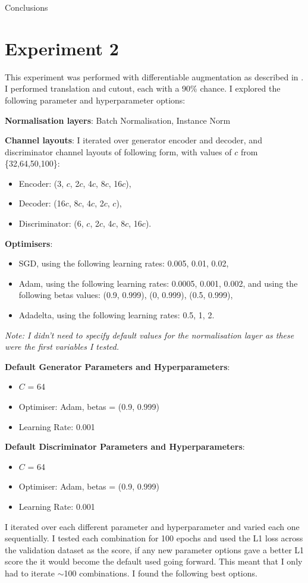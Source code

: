 \documentclass{UoYCSproject}
\begin{document}
Conclusions

\section{Experiment 2}
This experiment was performed with differentiable augmentation as described in \cite{zhao2020differentiable}. I performed translation and cutout, each with a 90\% chance. I explored the following parameter and hyperparameter options:

\textbf{Normalisation layers}: Batch Normalisation, Instance Norm

\textbf{Channel layouts}:
I iterated over generator encoder and decoder, and discriminator channel layouts of following form, with values of $c$ from \{32,64,50,100\}:
\begin{itemize}
\item Encoder: (3, $c$, 2$c$, 4$c$, 8$c$, 16$c$), 
\item Decoder: (16$c$, 8$c$, 4$c$, 2$c$, $c$),
\item Discriminator: (6, $c$, 2$c$, 4$c$, 8$c$, 16$c$).
\end{itemize}

\textbf{Optimisers}:
\begin{itemize}
\item SGD, using the following learning rates: 0.005, 0.01, 0.02,
\item Adam, using the following learning rates: 0.0005, 0.001, 0.002, and using the following betas values: (0.9, 0.999), (0, 0.999), (0.5, 0.999),
\item Adadelta, using the following learning rates: 0.5, 1, 2.
\end{itemize}

\emph{Note: I didn't need to specify default values for the normalisation layer as these were the first variables I tested.}

\textbf{Default Generator Parameters and Hyperparameters}: 
\begin{itemize}
\item $C$ = 64
\item Optimiser: Adam, betas = (0.9, 0.999)
\item Learning Rate: 0.001
\end{itemize}
\textbf{Default Discriminator Parameters and Hyperparameters}:
\begin{itemize}
\item $C$ = 64
\item Optimiser: Adam, betas = (0.9, 0.999)
\item Learning Rate: 0.001
\end{itemize}
I iterated over each different parameter and hyperparameter and varied each one sequentially. I tested each combination for 100 epochs and used the L1 loss across the validation dataset as the score, if any new parameter options gave a better L1 score the it would become the default used going forward. This meant that I only had to iterate \(\sim\)100 combinations. I found the following best options.
\end{document}
